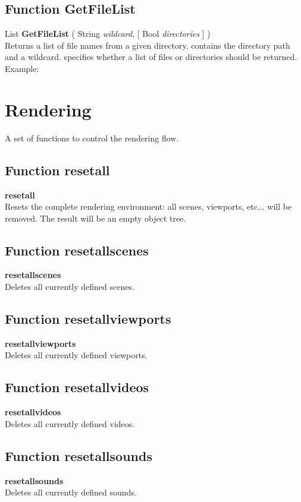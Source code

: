 \subsection{Function GetFileList \label{F:GetFileList}}
List \textbf{GetFileList} ( String \textit{wildcard},  [ Bool \textit{directories} ] ) \\
Returns a list of file names from a given directory.  contains the directory path and a wildcard.  specifies whether a list of files or directories should be returned.
Example: \\

\section{Rendering \label{Rendering}}
A set of functions to control the rendering flow.

\subsection{Function resetall \label{F:resetall}}
\textbf{resetall} \\
Resets the complete rendering environment: all scenes, viewports, etc... will be removed. The result will be an empty object tree.

\subsection{Function resetallscenes \label{F:resetallscenes}}
\textbf{resetallscenes} \\
Deletes all currently defined scenes.

\subsection{Function resetallviewports \label{F:resetallviewports}}
\textbf{resetallviewports} \\
Deletes all currently defined viewports.

\subsection{Function resetallvideos \label{F:resetallvideos}}
\textbf{resetallvideos} \\
Deletes all currently defined videos.

\subsection{Function resetallsounds \label{F:resetallsounds}}
\textbf{resetallsounds} \\
Deletes all currently defined sounds.

